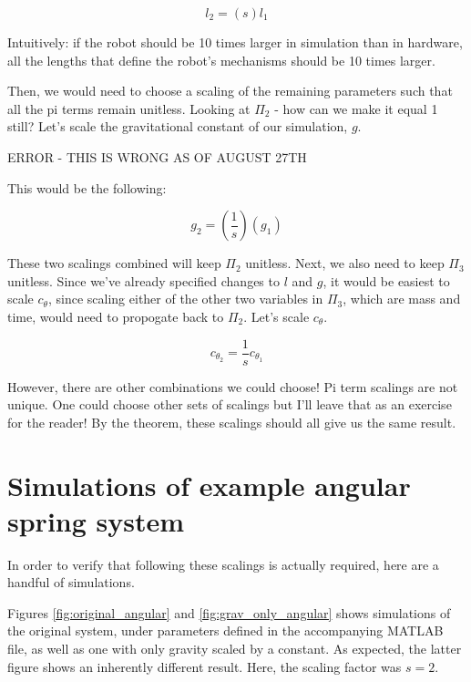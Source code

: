\documentclass[12pt,letterpaper]{article}
\begin{document}
\[
l_2 = (s) l_1
\]

Intuitively: if the robot should be 10 times larger in simulation than in hardware, all the lengths that define the robot's mechanisms should be 10 times larger.


Then, we would need to choose a scaling of the remaining parameters such that all the pi terms remain unitless.
Looking at $\Pi_2$ - how can we make it equal 1 still? Let's scale the gravitational constant of our simulation, $g$.

ERROR - THIS IS WRONG AS OF AUGUST 27TH


This would be the following:

\[
g_2 = (\frac{1}{s}) (g_1)
\]

These two scalings combined will keep $\Pi_2$ unitless.
Next, we also need to keep $\Pi_3$ unitless.
Since we've already specified changes to $l$ and $g$, it would be easiest to scale $c_\theta$, since scaling either of the other two variables in $\Pi_3$, which are mass and time, would need to propogate back to $\Pi_2$.
Let's scale $c_\theta$.


\[
c_{\theta_2} = \frac{1}{s} c_{\theta_1}
\]

However, there are other combinations we could choose! 
Pi term scalings are not unique.
One could choose other sets of scalings but I'll leave that as an exercise for the reader!
By the theorem, these scalings should all give us the same result.



\section{Simulations of example angular spring system}

In order to verify that following these scalings is actually required, here are a handful of simulations.

Figures \ref{fig:original_angular} and \ref{fig:grav_only_angular} shows simulations of the original system, under parameters defined in the accompanying MATLAB file, as well as one with only gravity scaled by a constant.
As expected, the latter figure shows an inherently different result.
Here, the scaling factor was $s=2$.
\end{document}
